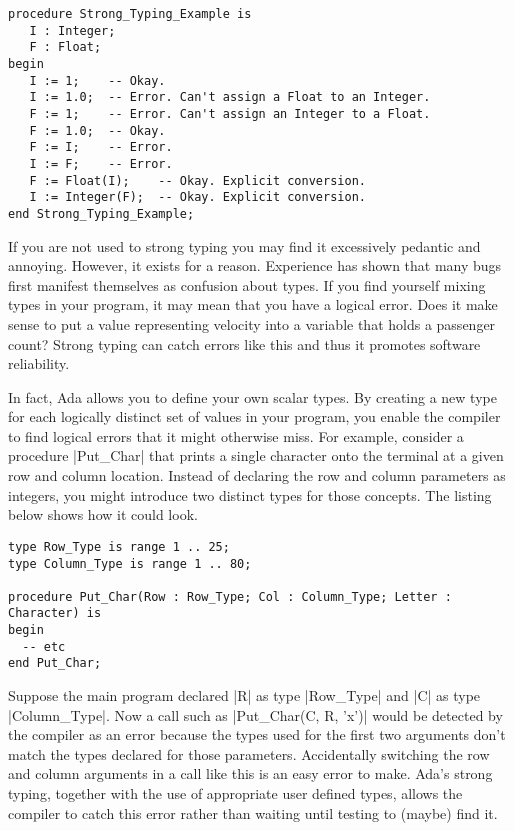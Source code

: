 \begin{lstlisting}
procedure Strong_Typing_Example is
   I : Integer;
   F : Float;
begin
   I := 1;    -- Okay.
   I := 1.0;  -- Error. Can't assign a Float to an Integer.
   F := 1;    -- Error. Can't assign an Integer to a Float.
   F := 1.0;  -- Okay.
   F := I;    -- Error.
   I := F;    -- Error.
   F := Float(I);    -- Okay. Explicit conversion.
   I := Integer(F);  -- Okay. Explicit conversion.
end Strong_Typing_Example;
\end{lstlisting}

If you are not used to strong typing you may find it excessively pedantic and annoying. However,
it exists for a reason. Experience has shown that many bugs first manifest themselves as
confusion about types. If you find yourself mixing types in your program, it may mean that you
have a logical error. Does it make sense to put a value representing velocity into a variable
that holds a passenger count? Strong typing can catch errors like this and thus it promotes
software reliability.

In fact, Ada allows you to define your own scalar types. By creating a new type for each
logically distinct set of values in your program, you enable the compiler to find logical errors
that it might otherwise miss. For example, consider a procedure |Put_Char| that prints a single
character onto the terminal at a given row and column location. Instead of declaring the row and
column parameters as integers, you might introduce two distinct types for those concepts. The
listing below shows how it could look.

\begin{lstlisting}
type Row_Type is range 1 .. 25;
type Column_Type is range 1 .. 80;

procedure Put_Char(Row : Row_Type; Col : Column_Type; Letter : Character) is
begin
  -- etc
end Put_Char;
\end{lstlisting}

Suppose the main program declared |R| as type |Row_Type| and |C| as type |Column_Type|. Now a
call such as |Put_Char(C, R, 'x')| would be detected by the compiler as an error because the
types used for the first two arguments don't match the types declared for those parameters.
Accidentally switching the row and column arguments in a call like this is an easy error to
make. Ada's strong typing, together with the use of appropriate user defined types, allows the
compiler to catch this error rather than waiting until testing to (maybe) find it.


